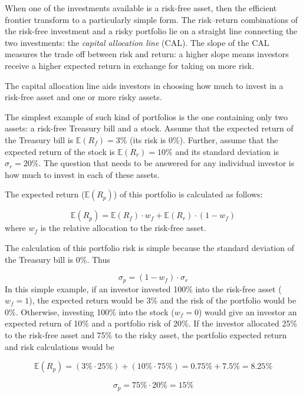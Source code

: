 When one of the investments available is a risk-free asset, then the efficient frontier transform to a particularly simple form. The risk–return combinations of the risk-free investment and a risky portfolio lie on a straight line connecting the two investments: the \emph{capital allocation line} (CAL). The slope of the CAL measures the trade off between risk and return: a higher slope means investors receive a higher expected return in exchange for taking on more risk.

The capital allocation line aids investors in choosing how much to invest in a risk-free asset and one or more risky assets.

The simplest example of such kind of portfolios is the one containing only two assets: a risk-free Treasury bill and a stock. Assume that the expected return of the Treasury bill is \(\mathbb{E}(R_f)=3\%\) (its risk is 0\%). Further, assume that the expected return of the stock is \(\mathbb{E}(R_r)=10\%\) and its standard deviation is \(\sigma_r=20\%\). The question that needs to be answered for any individual investor is how much to invest in each of these assets.

The expected return (\(\mathbb{E}(R_p)\)) of this portfolio is calculated as follows:

\begin{equation*} 
	\mathbb{E}(R_p) = \mathbb{E}(R_f)\cdot w_f + \mathbb{E}(R_r)\cdot (1- w_f) 
\end{equation*}
where \(w_f\) is the relative allocation to the risk-free asset.

The calculation of this portfolio risk is simple because the standard deviation of the Treasury bill is 0\%. Thus

\begin{equation*} 
	\sigma_p = (1-w_f)\cdot \sigma_r 
\end{equation*}
In this simple example, if an investor invested 100\% into the risk-free asset (\(w_f=1\)), the expected return would be 3\% and the risk of the portfolio would be 0\%. Otherwise, investing 100\% into the stock (\(w_f=0\)) would give an investor an expected return of 10\% and a portfolio risk of 20\%. If the investor allocated 25\% to the risk-free asset and 75\% to the risky asset, the portfolio expected return and risk calculations would be

\[ \mathbb{E}(R_p) = (3\% \cdot 25\%) + (10\% \cdot 75\%) = 0.75\% + 7.5\% = 8.25\% \]

\[ \sigma_p = 75\% \cdot 20\% = 15\% \]

